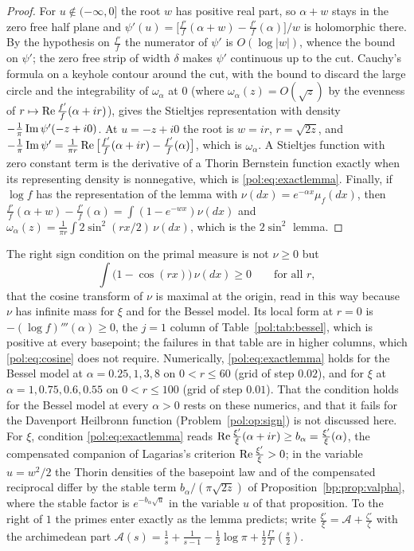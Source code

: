 \begin{proof}
For $u\notin(-\infty,0]$ the root $w$ has positive real part, so $\alpha+w$ stays in the zero free half plane and $\psi'(u)=\big[\frac{f'}{f}(\alpha+w)-\frac{f'}{f}(\alpha)\big]/w$ is holomorphic there. By the hypothesis on $\frac{f'}{f}$ the numerator of $\psi'$ is $O(\log|w|)$, whence the bound on $\psi'$; the zero free strip of width $\delta$ makes $\psi'$ continuous up to the cut. Cauchy's formula on a keyhole contour around the cut, with the bound to discard the large circle and the integrability of $\omega_\alpha$ at $0$ (where $\omega_\alpha(z)=O(\sqrt z)$ by the evenness of $r\mapsto\operatorname{Re}\frac{f'}{f}(\alpha+ir)$), gives the Stieltjes representation with density $-\frac1\pi\operatorname{Im}\psi'(-z+i0)$. At $u=-z+i0$ the root is $w=ir$, $r=\sqrt{2z}$, and $-\frac1\pi\operatorname{Im}\psi'=\frac{1}{\pi r}\operatorname{Re}\big[\frac{f'}{f}(\alpha+ir)-\frac{f'}{f}(\alpha)\big]$, which is $\omega_\alpha$. A Stieltjes function with zero constant term is the derivative of a Thorin Bernstein function exactly when its representing density is nonnegative, which is \eqref{pol:eq:exactlemma}. Finally, if $\log f$ has the representation of the lemma with $\nu(dx)=e^{-\alpha x}\mu_f(dx)$, then $\frac{f'}{f}(\alpha+w)-\frac{f'}{f}(\alpha)=\int(1-e^{-wx})\nu(dx)$ and $\omega_\alpha(z)=\frac{1}{\pi r}\int2\sin^2(rx/2)\,\nu(dx)$, which is the $2\sin^2$ lemma.
\end{proof}

The right sign condition on the primal measure is not $\nu\ge0$ but
\begin{equation}\label{pol:eq:cosine}
\int\big(1-\cos(rx)\big)\,\nu(dx)\ge0\qquad\text{for all } r,
\end{equation}
that the cosine transform of $\nu$ is maximal at the origin, read in this way because $\nu$ has infinite mass for $\xi$ and for the Bessel model. Its local form at $r=0$ is $-(\log f)'''(\alpha)\ge0$, the $j=1$ column of Table~\ref{pol:tab:bessel}, which is positive at every basepoint; the failures in that table are in higher columns, which \eqref{pol:eq:cosine} does not require. Numerically, \eqref{pol:eq:exactlemma} holds for the Bessel model at $\alpha=0.25,1,3,8$ on $0<r\le60$ (grid of step $0.02$), and for $\xi$ at $\alpha=1,0.75,0.6,0.55$ on $0<r\le100$ (grid of step $0.01$). That the condition holds for the Bessel model at every $\alpha>0$ rests on these numerics, and that it fails for the Davenport Heilbronn function (Problem~\ref{pol:op:sign}) is not discussed here. For $\xi$, condition \eqref{pol:eq:exactlemma} reads $\operatorname{Re}\frac{\xi'}{\xi}(\alpha+ir)\ge b_\alpha=\frac{\xi'}{\xi}(\alpha)$, the compensated companion of Lagarias's criterion $\operatorname{Re}\frac{\xi'}{\xi}>0$; in the variable $u=w^2/2$ the Thorin densities of the basepoint law and of the compensated reciprocal differ by the stable term $b_\alpha/(\pi\sqrt{2z})$ of Proposition~\ref{bp:prop:valpha}, where the stable factor is $e^{-b_\alpha\sqrt u}$ in the variable $u$ of that proposition. To the right of $1$ the primes enter exactly as the lemma predicts; write $\frac{\xi'}{\xi}=\mathcal A+\frac{\zeta'}{\zeta}$ with the archimedean part $\mathcal A(s)=\frac1s+\frac1{s-1}-\frac12\log\pi+\frac12\frac{\Gamma'}{\Gamma}(\frac s2)$.

